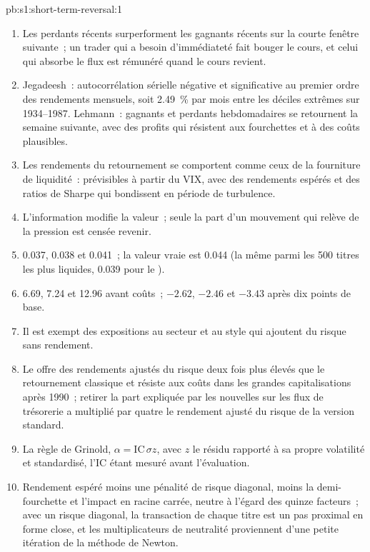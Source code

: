 \begin{solution}{pb:s1:short-term-reversal:1}
\begin{enumerate}
\item Les perdants récents surperforment les gagnants récents sur la courte fenêtre suivante~; un trader qui a besoin d'immédiateté fait bouger le cours, et celui qui absorbe le flux est rémunéré quand
le cours revient.
\item Jegadeesh~: autocorrélation sérielle négative et significative au premier ordre des rendements mensuels, soit 2.49~\% par mois entre les déciles extrêmes sur 1934--1987. Lehmann~: gagnants et perdants hebdomadaires
se retournent la semaine suivante, avec des profits qui résistent aux fourchettes et à des coûts plausibles.
\item Les rendements du retournement se comportent comme ceux de la fourniture de liquidité~: prévisibles à partir du VIX, avec des rendements espérés et des ratios de Sharpe qui bondissent en période de turbulence.
\item L'information modifie la valeur~; seule la part d'un mouvement qui relève de la pression est censée revenir.
\item 0.037, 0.038 et 0.041~; la valeur vraie est 0.044 (la même parmi les 500 titres les plus liquides, 0.039 pour le ).
\item 6.69, 7.24 et 12.96 avant coûts~; $-2.62$, $-2.46$ et $-3.43$ après dix points de base.
\item Il est exempt des expositions au secteur et au style qui ajoutent du risque sans rendement.
\item Le  offre des rendements ajustés du risque deux fois plus élevés que le retournement classique et résiste aux coûts dans les grandes capitalisations après 1990~; retirer la part
expliquée par les nouvelles sur les flux de trésorerie a multiplié par quatre le rendement ajusté du risque de la version standard.
\item La règle de Grinold, $\alpha = \mathrm{IC}\,\sigma z$, avec $z$ le résidu rapporté à sa propre volatilité et standardisé, l'IC étant mesuré avant
l'évaluation.
\item Rendement espéré moins une pénalité de risque diagonal, moins la demi-fourchette et l'impact en racine carrée, neutre à l'égard des quinze facteurs~; avec un risque diagonal, la transaction de chaque titre
est un pas proximal en forme close, et les multiplicateurs de neutralité proviennent d'une petite itération de la méthode de Newton.

\end{enumerate}
\end{solution}
